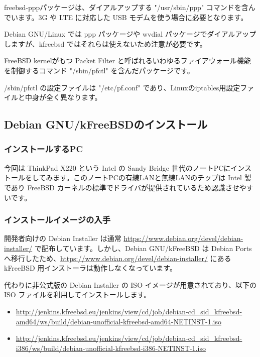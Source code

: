 \documentclass[mingoth,a4paper]{jsarticle}
\begin{document}
freebsd-pppパッケージは、ダイアルアップする "/usr/sbin/ppp" コマンドを含んでいます。3G や LTE に対応した USB モデムを使う場合に必要となります。

Debian GNU/Linux では ppp パッケージや wvdial パッケージでダイアルアップしますが、kfreebsd ではそれらは使えないため注意が必要です。


FreeBSD kernelがもつ Packet Filter と呼ばれるいわゆるファイアウォール機能を制御するコマンド "/sbin/pfctl" を含んだパッケージです。

/sbin/pfctl の設定ファイルは "/etc/pf.conf" であり、Linuxのiptables用設定ファイルと中身が全く異なります。


\subsection{Debian GNU/kFreeBSDのインストール}

\subsubsection{インストールするPC}

今回は ThinkPad X220 という Intel の Sandy Bridge 世代のノートPCにインストールをしてみます。このノートPCの有線LANと無線LANのチップは Intel 製であり FreeBSD カーネルの標準でドライバが提供されているため認識させやすいです。


\subsubsection{インストールイメージの入手}

開発者向けの Debian Installer は通常 \url{https://www.debian.org/devel/debian-installer/} で配布しています。しかし、Debian GNU/kFreeBSD は Debian Ports へ移行したため、\url{https://www.debian.org/devel/debian-installer/} にある kFreeBSD 用インストーラは動作しなくなっています。

代わりに非公式版の Debian Installer の ISO イメージが用意されており、以下の ISO ファイルを利用してインストールします。

\begin{itemize}
\item \url{http://jenkins.kfreebsd.eu/jenkins/view/cd/job/debian-cd_sid_kfreebsd-amd64/ws/build/debian-unofficial-kfreebsd-amd64-NETINST-1.iso}
\item \url{http://jenkins.kfreebsd.eu/jenkins/view/cd/job/debian-cd_sid_kfreebsd-i386/ws/build/debian-unofficial-kfreebsd-i386-NETINST-1.iso}
\end{itemize}
\end{document}
